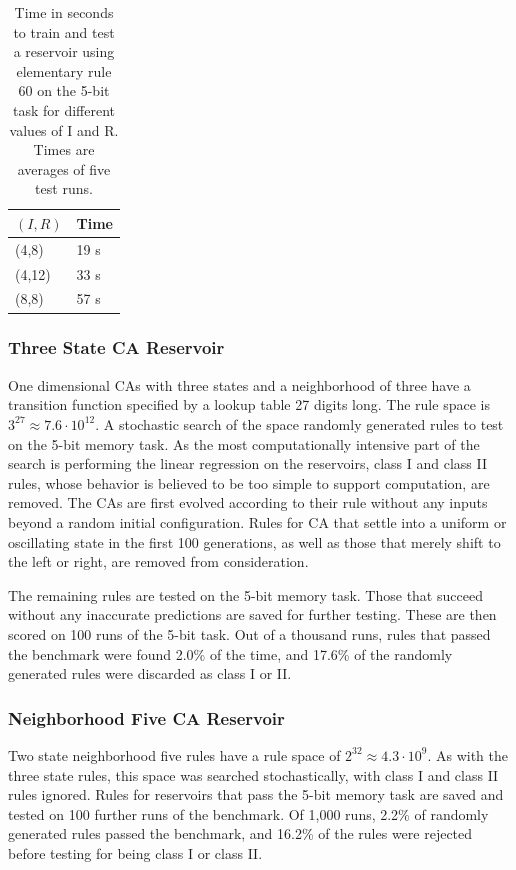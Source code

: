 \documentclass{elsarticle}
\begin{document}
\begin{multicols}{2}
\begin{table}[H] \centering
\begin{tabular}{|l|l|}
\hline
\boldmath$(I,R)$ & \textbf{Time} \\ \hline
(4,8) & 19 s \\ \hline
(4,12) & 33 s \\ \hline
(8,8) & 57 s \\ \hline
\end{tabular}
\caption{Time in seconds to train and test a reservoir using elementary rule 60 
    on the 5-bit task for different values of I and R. Times are averages of 
        five test runs.}
\label{table:time}
\end{table}

  
\subsubsection{Three State CA Reservoir}
One dimensional CAs with three states and a neighborhood of three have a 
transition function specified by a lookup table 27 digits long. The rule space 
is $3^{27} \approx 7.6 \cdot 10^{12}$. A stochastic search of the space 
randomly generated rules to test on the 5-bit memory task. As the most 
computationally intensive part of the search is performing the linear 
regression on the reservoirs, class I and class II rules, whose behavior is 
believed to be too simple to support computation, are removed. The CAs are 
first evolved according to their rule without any inputs beyond a random 
initial configuration. Rules for CA that settle into a uniform or oscillating 
state in the first 100 generations, as well as those that merely shift to the 
left or right, are removed from consideration.\par
The remaining rules are tested on the 5-bit memory task.  Those that succeed 
without any inaccurate predictions are saved for further testing.  These are 
then scored on 100 runs of the 5-bit task.  Out of a thousand runs, rules that 
passed the benchmark were found 2.0\% of the time, and 17.6\% of the randomly 
generated rules were discarded as class I or II.
    
\subsubsection{Neighborhood Five CA Reservoir}
Two state neighborhood five rules have a rule space of $2^32 \approx 4.3 \cdot 
   10^9$. As with the three state rules, this space was searched 
   stochastically, with class I and class II rules ignored. Rules for 
   reservoirs that pass the 5-bit memory task are saved and tested on 100 
   further runs of the benchmark. Of 1,000 runs, 2.2\% of randomly generated 
   rules passed the benchmark, and 16.2\% of the rules were rejected before 
   testing for being class I or class II.

\end{multicols}
\end{document}
